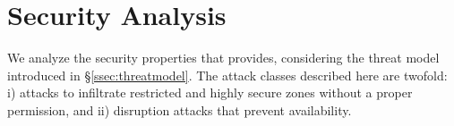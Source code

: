 \chapter{Security Analysis}
\label{analysis}




We analyze the security properties that \name provides, considering the threat model
introduced in \S\ref{ssec:threatmodel}. The attack classes described here are twofold:
i) attacks to infiltrate restricted and highly secure zones without a proper permission, 
and ii) disruption attacks that prevent availability. 



